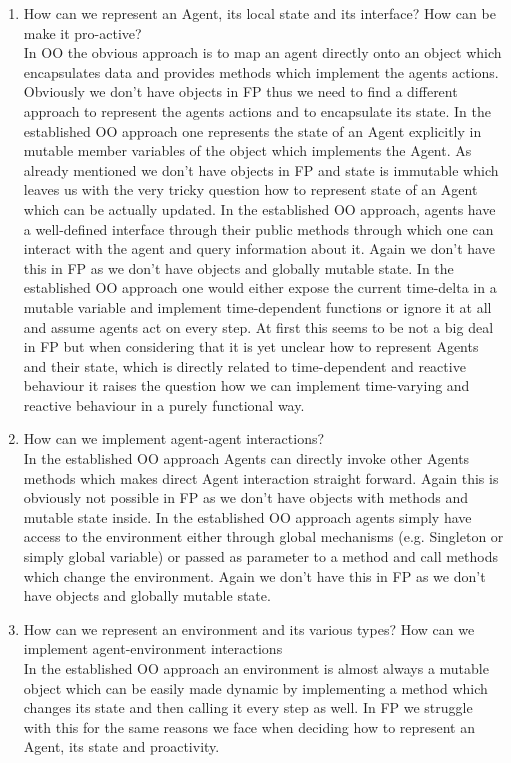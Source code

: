 \begin{enumerate}
	\item How can we represent an Agent, its local state and its interface? How can be make it pro-active? \\
	In OO the obvious approach is to map an agent directly onto an object which encapsulates data and provides methods which implement the agents actions. Obviously we don't have objects in FP thus we need to find a different approach to represent the agents actions and to encapsulate its state.
	In the established OO approach one represents the state of an Agent explicitly in mutable member variables of the object which implements the Agent. As already mentioned we don't have objects in FP and state is immutable which leaves us with the very tricky question how to represent state of an Agent which can be actually updated.
	In the established OO approach, agents have a well-defined interface through their public methods through which one can interact with the agent and query information about it. Again we don't have this in FP as we don't have objects and globally mutable state.
	In the established OO approach one would either expose the current time-delta in a mutable variable and implement time-dependent functions or ignore it at all and assume agents act on every step. At first this seems to be not a big deal in FP but when considering that it is yet unclear how to represent Agents and their state, which is directly related to time-dependent and reactive behaviour it raises the question how we can implement time-varying and reactive behaviour in a purely functional way.

	\item How can we implement agent-agent interactions? \\
	In the established OO approach Agents can directly invoke other Agents methods which makes direct Agent interaction straight forward. Again this is obviously not possible in FP as we don't have objects with methods and mutable state inside.
	In the established OO approach agents simply have access to the environment either through global mechanisms (e.g. Singleton or simply global variable) or passed as parameter to a method and call methods which change the environment. Again we don't have this in FP as we don't have objects and globally mutable state.
	
	\item How can we represent an environment and its various types? How can we implement agent-environment interactions \\
	In the established OO approach an environment is almost always a mutable object which can be easily made dynamic by implementing a method which changes its state and then calling it every step as well. In FP we struggle with this for the same reasons we face when deciding how to represent an Agent, its state and proactivity.
	

\end{enumerate}

